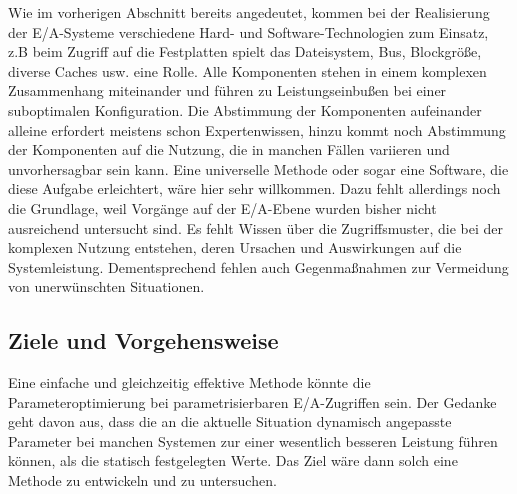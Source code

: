 
Wie im vorherigen Abschnitt bereits angedeutet, kommen bei der Realisierung der E/A-Systeme verschiedene Hard- und Software-Technologien zum Einsatz, z.B beim Zugriff auf die Festplatten spielt das Dateisystem, Bus, Blockgröße, diverse Caches usw. eine Rolle. Alle Komponenten stehen in einem komplexen Zusammenhang miteinander und führen zu Leistungseinbußen bei einer suboptimalen Konfiguration. Die Abstimmung der Komponenten aufeinander alleine erfordert meistens schon Expertenwissen, hinzu kommt noch Abstimmung der Komponenten auf die Nutzung, die in manchen Fällen variieren und unvorhersagbar sein kann. Eine universelle Methode oder sogar eine Software, die diese Aufgabe erleichtert, wäre hier sehr willkommen. Dazu fehlt allerdings noch die Grundlage, weil Vorgänge auf der E/A-Ebene wurden bisher nicht ausreichend untersucht sind. Es fehlt Wissen über die Zugriffsmuster, die bei der komplexen Nutzung entstehen, deren Ursachen und Auswirkungen auf die Systemleistung. Dementsprechend fehlen auch 
Gegenmaßnahmen zur Vermeidung von unerwünschten Situationen.

\subsection{Ziele und Vorgehensweise}

Eine einfache und gleichzeitig effektive Methode könnte die Parameteroptimierung bei parametrisierbaren E/A-Zugriffen sein. 
Der Gedanke geht davon aus, dass die an die aktuelle Situation dynamisch angepasste Parameter bei manchen Systemen zur einer wesentlich besseren Leistung führen können, als die statisch festgelegten Werte. Das Ziel wäre dann solch eine Methode zu entwickeln und zu untersuchen.



